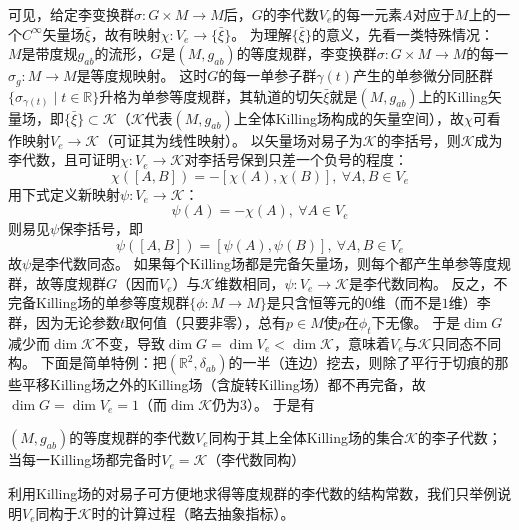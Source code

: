 可见，给定李变换群$\sigma \colon G \times M \to M$后，$G$的李代数$V_e$的每一元素$A$对应于$M$上的一个$C^\infty$矢量场$\bar\xi$，故有映射$\chi \colon V_e \to \{\bar\xi\}$。
为理解$\{\bar\xi\}$的意义，先看一类特殊情况：
$M$是带度规$g_{ab}$的流形，$G$是$(M, g_{ab})$的等度规群，李变换群$\sigma \colon G \times M \to M$的每一$\sigma_g \colon M \to M$是等度规映射。
这时$G$的每一单参子群$\gamma(t)$产生的单参微分同胚群$\{\sigma_{\gamma(t)} \mid t \in \mathbb{R}\}$升格为单参等度规群，其轨道的切矢$\bar\xi$就是$(M, g_{ab})$上的Killing矢量场，即$\{\bar\xi\} \subset \mathscr{K}$（$\mathscr{K}$代表$(M, g_{ab})$上全体Killing场构成的矢量空间），故$\chi$可看作映射$V_e \to \mathscr{K}$（可证其为线性映射）。
以矢量场对易子为$\mathscr{K}$的李括号，则$\mathscr{K}$成为李代数，且可证明$\chi \colon V_e \to \mathscr{K}$对李括号保到只差一个负号的程度：
$$\chi([A, B]) = -[\chi(A), \chi(B)], ~ \forall A, B \in V_e$$
用下式定义新映射$\psi \colon V_e \to \mathscr{K}$：
$$\psi(A) = -\chi(A), ~ \forall A \in V_e$$
则易见$\psi$保李括号，即
$$\psi([A, B]) = [\psi(A), \psi(B)], ~ \forall A, B \in V_e$$
故$\psi$是李代数同态。
如果每个Killing场都是完备矢量场，则每个都产生单参等度规群，故等度规群$G$（因而$V_e$）与$\mathscr{K}$维数相同，$\psi \colon V_e \to \mathscr{K}$是李代数同构。
反之，不完备Killing场的单参等度规群$\{\phi \colon M \to M\}$是只含恒等元的$0$维（而不是$1$维）李群，因为无论参数$t$取何值（只要非零），总有$p \in M$使$p$在$\phi_t$下无像。
于是$\dim G$减少而$\dim\mathscr{K}$不变，导致$\dim G = \dim V_e < \dim\mathscr{K}$，意味着$V_e$与$\mathscr{K}$只同态不同构。
下面是简单特例：把$(\mathbb{R}^2, \delta_{ab})$的一半（连边）挖去，则除了平行于切痕的那些平移Killing场之外的Killing场（含旋转Killing场）都不再完备，故$\dim G = \dim V_e = 1$（而$\dim\mathscr{K}$仍为$3$）。
于是有

\begin{theorem}
    $(M, g_{ab})$的等度规群的李代数$V_e$同构于其上全体Killing场的集合$\mathscr{K}$的李子代数；
    当每一Killing场都完备时$V_e = \mathscr{K}$（李代数同构）
\end{theorem}

利用Killing场的对易子可方便地求得等度规群的李代数的结构常数，我们只举例说明$V_e$同构于$\mathscr{K}$时的计算过程（略去抽象指标）。

